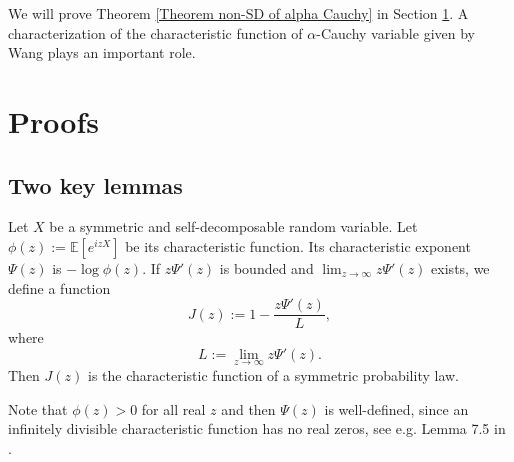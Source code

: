 \documentclass[12pt]{amsart}
\begin{document}
 We will prove Theorem \ref{Theorem non-SD of alpha Cauchy} in Section \ref{section proof}. A characterization of the characteristic function of $\alpha$-Cauchy variable given by Wang \cite{Wan26+} plays an important role. 





\section{Proofs}
\label{section proof}



\subsection{Two key lemmas}


\begin{lemma}\label{keyLemma1}
Let $X$ be a symmetric and self-decomposable random variable. Let $\phi(z) := \mathbb{E}[e^{izX}]$ be its characteristic function. Its characteristic exponent $\Psi(z)$ is $ -\log \phi(z)$. If $z\Psi'(z)$ is bounded and $\lim_{z \rightarrow  \infty} z\Psi'(z)$ exists, we define a function
\begin{equation}
    \label{eq def J}
    J(z) := 1 - \frac{z \Psi'(z)}{L},
\end{equation}
where 
$$ L :=  \lim_{z \rightarrow  \infty} z\Psi'(z).$$
 Then $J(z)$ is the characteristic function of a symmetric probability law. 
\end{lemma}

Note that $\phi(z) > 0$ for all real $z$ and then $\Psi(z)$ is well-defined, since an infinitely divisible characteristic function has no real zeros, see e.g. Lemma 7.5 in \cite{Sat99}. 
\end{document}
